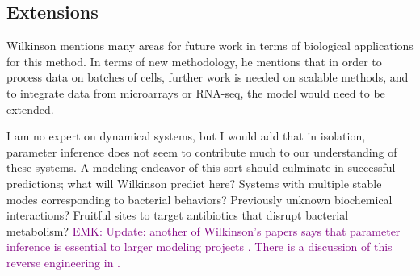 \documentclass{article}
\newcommand\EMK[1]{\textcolor{purple}{EMK: #1}}
\begin{document}
 \subsection{Extensions}

Wilkinson mentions many areas for future work in terms of biological applications for this method. In terms of new methodology, he mentions that in order to process data on batches of cells, further work is needed on scalable methods, and to integrate data from microarrays or RNA-seq, the model would need to be extended. 

I am no expert on dynamical systems, but I would add that in isolation, parameter inference does not seem to contribute much to our understanding of these systems. A modeling endeavor of this sort should culminate in successful predictions; what will Wilkinson predict here? Systems with multiple stable modes corresponding to bacterial behaviors? Previously unknown biochemical interactions? Fruitful sites to target antibiotics that disrupt bacterial metabolism? \EMK{Update: another of Wilkinson's papers says that parameter inference is essential to larger modeling projects \cite{golightly2005bayesian}. There is a discussion of this reverse engineering in \cite{Bower:2004:CMG:1197014}.}


\end{document}
